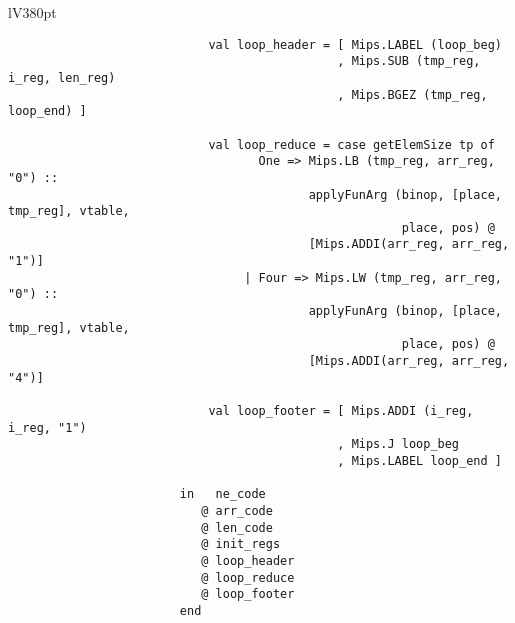 \documentclass[a4paper]{article}
\begin{document}
\begin{appendices}
\begin{center}
\begin{tabular}{lV{380pt}}
\begin{verbatim}
				            val loop_header = [ Mips.LABEL (loop_beg)
				                              , Mips.SUB (tmp_reg, i_reg, len_reg)
				                              , Mips.BGEZ (tmp_reg, loop_end) ]
				
				            val loop_reduce = case getElemSize tp of
				                   One => Mips.LB (tmp_reg, arr_reg, "0") ::
				                          applyFunArg (binop, [place, tmp_reg], vtable, 
				                                       place, pos) @ 
				                          [Mips.ADDI(arr_reg, arr_reg, "1")]
				                 | Four => Mips.LW (tmp_reg, arr_reg, "0") ::
				                          applyFunArg (binop, [place, tmp_reg], vtable, 
				                                       place, pos) @ 
				                          [Mips.ADDI(arr_reg, arr_reg, "4")]
				
				            val loop_footer = [ Mips.ADDI (i_reg, i_reg, "1")
				                              , Mips.J loop_beg
				                              , Mips.LABEL loop_end ]
				
				        in   ne_code
				           @ arr_code                              
				           @ len_code
				           @ init_regs                          
				           @ loop_header                        
				           @ loop_reduce                      
				           @ loop_footer                        
				        end
			\end{verbatim}
			\\
			\bottomrule \\
		\end{tabular}
	\end{center}
\end{appendices}
\end{document}
